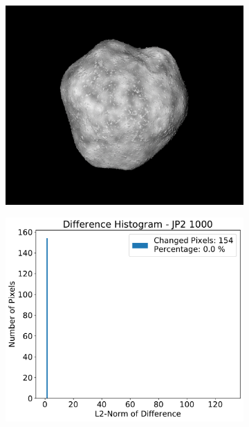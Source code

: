 \begin{figure}[htb]
    \centering
    \begin{subfigure}[b]{0.48\textwidth}
        \centering
        \includegraphics[width=\textwidth]{doc/thesis/0_figures/compare_quality/set1/jp2_1000}
        \caption{}
        \label{fig:img_quality_comp_jp2_1000_orig}
    \end{subfigure}
    \begin{subfigure}[b]{0.48\textwidth}
        \centering
        \includegraphics[width=\textwidth]{doc/thesis/0_figures/compare_quality/set1/jp2_1000_diff_histogram}

\end{subfigure}
\end{figure}
